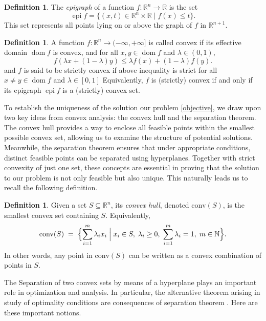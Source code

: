 \documentclass[12pt]{article}
\theoremstyle{plain}
\theoremstyle{definition}
\newtheorem{definition}[theorem]{Definition}
\begin{document}
\begin{definition} The \textit{epigraph} of a function $f : \mathbb{R}^n \to \mathbb{R}$ is the set
	$$
	\operatorname{epi} f = \{ (x, t) \in \mathbb{R}^n \times \mathbb{R} \mid f(x) \leq t \}.
	$$
	This set represents all points lying on or above the graph of $f$ in $\mathbb{R}^{n+1}$. 
\end{definition}

\begin{definition} A function $f : \mathbb{R}^n \to (-\infty, +\infty]$ is called convex if its effective domain $\operatorname{dom} f$ is convex, and for all $x, y \in \operatorname{dom} f$ and $\lambda \in (0,1)$,
	$$
	f(\lambda x + (1 - \lambda) y) \leq \lambda f(x) + (1 - \lambda) f(y).
	$$
	and $f$ is said to be strictly convex if above inequality is strict for all $ x \ne y \in \operatorname{dom} f$ and $\lambda \in [0,1]$
	Equivalently, $f$ is (strictly)  convex if and only if its epigraph $\operatorname{epi} f$ is a  (strictly)  convex set.
\end{definition}


To establish the uniqueness of the solution our problem \eqref{objective}, we draw upon two key ideas from convex analysis: the convex hull and the separation theorem. The convex hull provides a way to enclose all feasible points within the smallest possible convex set, allowing us to examine the structure of potential solutions. Meanwhile, the separation theorem ensures that under appropriate conditions, distinct feasible points can be separated using hyperplanes. Together with strict convexity of just one set, these concepts are essential in proving that the solution to our problem is not only feasible but also unique. This naturally leads us to recall the following definition.

\begin{definition} \label{def:convex_hull}	Given a set \( S \subseteq \mathbb{R}^n \), its \emph{convex hull}, denoted \(\mathrm{conv}(S)\), is the smallest convex set containing \(S\). Equivalently, \cite[Definition 6.11 ]{Be14}
	\[
	\mathrm{conv}(S)
	\;=\;
	\Bigl\{
	\sum_{i=1}^{m} \lambda_i x_i
	\;\Big\vert\;
	x_i \in S, \;
	\lambda_i \ge 0, \;
	\sum_{i=1}^{m} \lambda_i = 1, \;
	m \in \mathbb{N}
	\Bigr\}.
	\]
	In other words, any point in \(\mathrm{conv}(S)\) can be written as a convex combination of points in \(S\).
\end{definition}

The Separation of two convex sets by means of a hyperplane plays an important role in optimization and analysis. In particular, the alternative theorem arising in study of optimality conditions are consequences of separation theorem \cite[p.124]{HiLe96}. Here are these important notions.    
\end{document}
